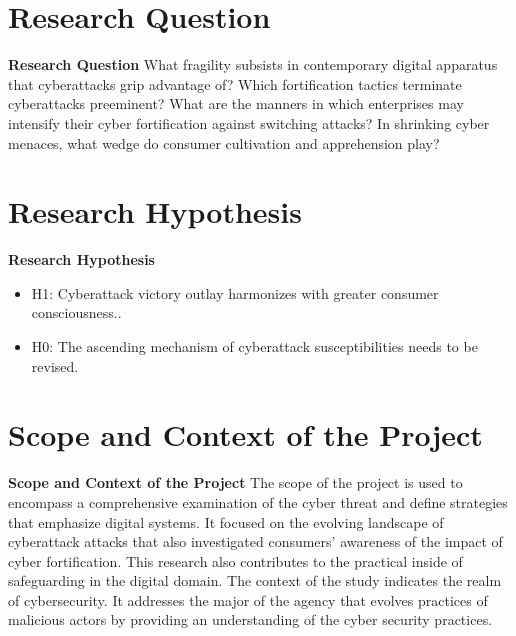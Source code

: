 
\section{Research Question}
\label{sec:into_back}
\textbf{Research Question}
What fragility subsists in contemporary digital apparatus that cyberattacks grip advantage of?
Which fortification tactics terminate cyberattacks preeminent?
What are the manners in which enterprises may intensify their cyber fortification against switching attacks?
In shrinking cyber menaces, what wedge do consumer cultivation and apprehension play?



\section{Research Hypothesis}
\label{sec:into_back}
\textbf{Research Hypothesis}
\begin{itemize}
     
    \item H1: Cyberattack victory outlay harmonizes with greater consumer consciousness..
    \item H0: The ascending mechanism of cyberattack susceptibilities needs to be revised.

\end{itemize}


\section{Scope and Context of the Project}
\label{sec:into_back}
\textbf{Scope and Context of the Project}
The scope of the project is used to encompass a comprehensive examination of the cyber threat and define strategies that emphasize digital systems. It focused on the evolving landscape of cyberattack attacks that also investigated consumers' awareness of the impact of cyber fortification. This research also contributes to the practical inside of safeguarding in the digital domain.
The context of the study indicates the realm of cybersecurity. It addresses the major of the agency that evolves practices of malicious actors by providing an understanding of the cyber security practices.


